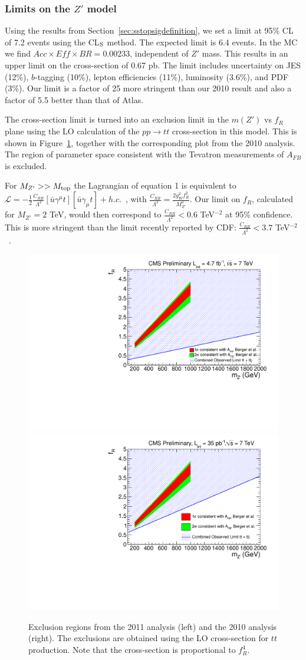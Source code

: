 \subsubsection{Limits on the $Z'$ model}
\label{sec:sstopslimits}
Using the results from Section~\ref{sec:sstopsigdefinition}, we set 
a limit at 95\% CL of 7.2 events using the CL$_{\rm S}$ method.
The expected limit is 6.4 events.
In the MC we find $Acc \times Eff \times BR = 0.00233$, independent of $Z'$ mass. 
This results in an upper limit on the cross-section of 0.67 pb.
The limit includes uncertainty
on JES (12\%), $b$-tagging (10\%), lepton efficiencies (11\%), luminosity (3.6\%),
and PDF (3\%).
Our limit is a factor of 25 more stringent than our
2010 result\cite{sstop} and also a factor of 5.5 better
than that of Atlas\cite{sstopatlas}.

The cross-section limit is turned into an exclusion limit in the $m(Z')$ vs $f_R$
plane using the LO calculation of the $pp \to tt$ cross-section in this model.
This is shown in Figure~\ref{fig:sstopexclusion}, together with the corresponding
plot from the 2010 analysis.  The region of parameter space consistent 
with the Tevatron measurements of $A_{FB}$ is excluded.


For $M_{Z'} >> M_{\rm top}$ the Lagrangian of equation 1 is 
equivalent to 
$\mathcal{L} = -\frac{1}{2}\frac{C_{RR}}{\Lambda^2}
 [\bar{u} \gamma^\mu t][\bar{u} \gamma_{\mu} t] + h.c.$~\cite{cdfth2},
with $\frac{C_{RR}}{\Lambda^2} = \frac{2 g_W^2 f_R^2}{M_{Z'}^2}$.
 Our limit on $f_R$, calculated for $M_{Z'}=2$ TeV, 
would then correspond to $\frac{C_{RR}}{\Lambda^2} < 0.6$ TeV$^{-2}$ at 
95\% confidence.  This is more stringent than the limit recently reported
by CDF: $\frac{C_{RR}}{\Lambda^2} < 3.7$ TeV$^{-2}$~\cite{cdflimit}.


\begin{figure}[htb]
\begin{center}
\includegraphics[width=0.45\linewidth]{figs/zprimecombined.pdf}
\includegraphics[width=0.45\linewidth]{figs/sscomb.pdf}
\caption{Exclusion regions from the 2011 analysis (left) and the 2010 analysis (right).
The exclusions are obtained using the LO cross-section for $tt$ production.  
Note that the cross-section is proportional to $f_R^4$.
\label{fig:sstopexclusion}}
\end{center}
\end{figure}

